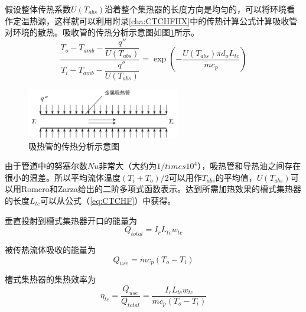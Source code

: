 
假设整体传热系数$U(T_{abs})$沿着整个集热器的长度方向是均匀的，可以将环境看作定温热源，这样就可以利用附录\ref{cha:CTCHFHX}中的传热计算公式计算吸收管对环境的散热。吸收管的传热分析示意图如图\ref{fig:Pipe}所示。
\begin{equation}
	\frac{T_{o}-T_{amb}-\dfrac{q''}{U(T_{abs})}}{T_{i}-T_{amb}-\dfrac{q''}{U(T_{abs})}}=\exp(-\frac{U(T_{abs})\pi d_o L_{tc}}{\dot{m}c_{p}})\label{eq:CTCHF}
\end{equation}

\begin{figure}[!ht]
\centering
\includegraphics[width=0.6\textwidth]{fig/Pipe.pdf}
\caption{吸热管的传热分析示意图}\label{fig:Pipe}
\end{figure}

由于管道中的努塞尔数$Nu$非常大（大约为$1/times10^4$），吸热管和导热油之间存在很小的温差。所以平均流体温度$(T_{i}+T_{o})/2$可以用作$T_{abs}$的平均值，$U(T_{abs})$可以用Romero和Zarza给出的二阶多项式函数表示\cite{Romero2007}。达到所需加热效果的槽式集热器的长度$L_{tc}$可以从公式（\ref{eq:CTCHF}）中获得。

垂直投射到槽式集热器开口的能量为
\begin{equation}
  Q_{total} = I_r L_{tc} w_{tc}
\end{equation}

被传热流体吸收的能量为
\begin{equation}
  Q_{use} = \dot{m}c_p(T_o - T_i)
\end{equation}

槽式集热器的集热效率为
\begin{equation}
  \eta_{tc} = \dfrac{Q_{use}}{Q_{total}} = 
  \dfrac{I_r L_{tc} w_{tc}}{\dot{m}c_p(T_o - T_i)}
  \label{eq:eta_tc}
\end{equation}

